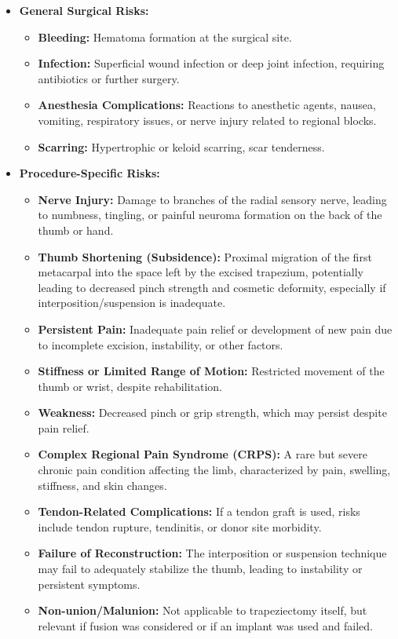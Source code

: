 \begin{itemize}
  \item \textbf{General Surgical Risks:}
    \begin{itemize}
      \item \textbf{Bleeding:} Hematoma formation at the surgical site.
      \item \textbf{Infection:} Superficial wound infection or deep joint infection, requiring antibiotics or further surgery.
      \item \textbf{Anesthesia Complications:} Reactions to anesthetic agents, nausea, vomiting, respiratory issues, or nerve injury related to regional blocks.
      \item \textbf{Scarring:} Hypertrophic or keloid scarring, scar tenderness.
    \end{itemize}
  \item \textbf{Procedure-Specific Risks:}
    \begin{itemize}
      \item \textbf{Nerve Injury:} Damage to branches of the radial sensory nerve, leading to numbness, tingling, or painful neuroma formation on the back of the thumb or hand.
      \item \textbf{Thumb Shortening (Subsidence):} Proximal migration of the first metacarpal into the space left by the excised trapezium, potentially leading to decreased pinch strength and cosmetic deformity, especially if interposition/suspension is inadequate.
      \item \textbf{Persistent Pain:} Inadequate pain relief or development of new pain due to incomplete excision, instability, or other factors.
      \item \textbf{Stiffness or Limited Range of Motion:} Restricted movement of the thumb or wrist, despite rehabilitation.
      \item \textbf{Weakness:} Decreased pinch or grip strength, which may persist despite pain relief.
      \item \textbf{Complex Regional Pain Syndrome (CRPS):} A rare but severe chronic pain condition affecting the limb, characterized by pain, swelling, stiffness, and skin changes.
      \item \textbf{Tendon-Related Complications:} If a tendon graft is used, risks include tendon rupture, tendinitis, or donor site morbidity.
      \item \textbf{Failure of Reconstruction:} The interposition or suspension technique may fail to adequately stabilize the thumb, leading to instability or persistent symptoms.
      \item \textbf{Non-union/Malunion:} Not applicable to trapeziectomy itself, but relevant if fusion was considered or if an implant was used and failed.
    \end{itemize}
\end{itemize}

